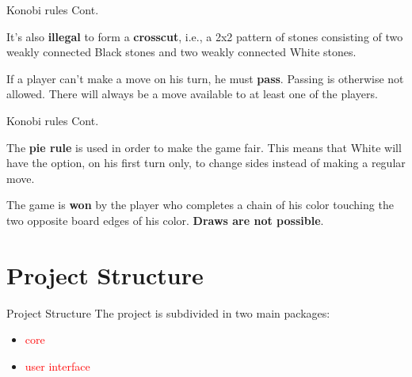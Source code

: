 \documentclass{beamer}
\begin{document}
  \begin{frame}{Konobi rules Cont.}

    It's also \textbf{illegal} to form a \textbf{crosscut}, i.e., a 2x2 pattern of stones consisting of two weakly connected Black stones and two weakly connected White stones.

    \vspace{1em}

    \begin{centering}


    \end{centering}\pause

    \vspace{1em}

    If a player can't make a move on his turn, he must \textbf{pass}. Passing is otherwise not allowed. There will always be a move available to at least one of the players.

  \end{frame}


  \begin{frame}{Konobi rules Cont.}

    The \textbf{pie rule} is used in order to make the game fair. This means that White will have the option, on his first turn only, to change sides instead of making a regular move.\pause

    \vspace{3em}

    The game is \textbf{won} by the player who completes a chain of his color touching the two opposite board edges of his color. \textbf{Draws are not possible}.

  \end{frame}


 \section{Project Structure}

  \begin{frame}{Project Structure} 
  The project is subdivided in two main packages:
    \begin{itemize}
        \item \textcolor{red}{core}
        \item \textcolor{red}{user interface}
     \end{itemize}

 \vspace{4em}

	
    \end{frame}
\end{document}
